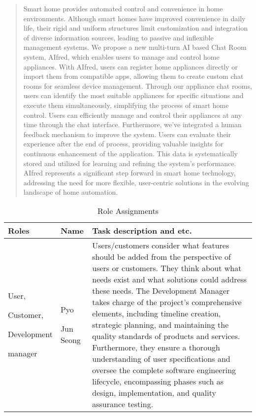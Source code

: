 \documentclass[conference]{IEEEtran}
\begin{document}
\begin{abstract}
Smart home provides automated control and convenience in home environments. Although smart homes have improved convenience in daily life, their rigid and uniform structures limit customization and integration of diverse information sources, leading to passive and inflexible management systems. We propose a new multi-turn AI based Chat Room system, AIfred, which enables users to manage and control home appliances. With AIfred, users can register home appliances directly or import them from compatible apps, allowing them to create custom chat rooms for seamless device management. Through our appliance chat rooms, users can identify the most suitable appliances for specific situations and execute them simultaneously, simplifying the process of smart home control. Users can efficiently manage and control their appliances at any time through the chat interface. Furthermore, we've integrated a human feedback mechanism to improve the system. Users can evaluate their experience after the end of process, providing valuable insights for continuous enhancement of the application. This data is systematically stored and utilized for learning and refining the system's performance. AIfred represents a significant step forward in smart home technology, addressing the need for more flexible, user-centric solutions in the evolving landscape of home automation.
\end{abstract}

\begin{table}[h]
\caption{Role Assignments}
\def\arraystretch{1.24} \small

\begin{tabular}{|p{1.5cm}|p{1.2cm}|p{4.9cm}|}
    \hline
    Roles & Name & Task description and etc. \\ 
    \hline
    User, \par Customer,\par Development \par manager & Pyo \par Jun Seong & Users/customers consider what features should be added from the perspective of users or customers. They think about what needs exist and what solutions could address these needs.
    The Development Manager takes charge of the project's comprehensive elements, including timeline creation, strategic planning, and maintaining the quality standards of products and services. Furthermore, they ensure a thorough understanding of user specifications and oversee the complete software engineering lifecycle, encompassing phases such as design, implementation, and quality assurance testing.\\
    \hline
\end{tabular}
\end{table}
\end{document}
